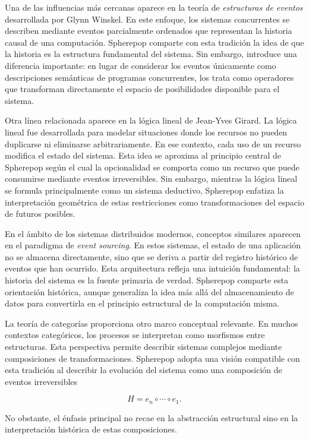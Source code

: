 \documentclass[12pt]{article}
\begin{document}
Una de las influencias más cercanas aparece en la teoría de \emph{estructuras de eventos} desarrollada por Glynn Winskel. En este enfoque, los sistemas concurrentes se describen mediante eventos parcialmente ordenados que representan la historia causal de una computación. Spherepop comparte con esta tradición la idea de que la historia es la estructura fundamental del sistema. Sin embargo, introduce una diferencia importante: en lugar de considerar los eventos únicamente como descripciones semánticas de programas concurrentes, los trata como operadores que transforman directamente el espacio de posibilidades disponible para el sistema.

Otra línea relacionada aparece en la lógica lineal de Jean-Yves Girard. La lógica lineal fue desarrollada para modelar situaciones donde los recursos no pueden duplicarse ni eliminarse arbitrariamente. En ese contexto, cada uso de un recurso modifica el estado del sistema. Esta idea se aproxima al principio central de Spherepop según el cual la opcionalidad se comporta como un recurso que puede consumirse mediante eventos irreversibles. Sin embargo, mientras la lógica lineal se formula principalmente como un sistema deductivo, Spherepop enfatiza la interpretación geométrica de estas restricciones como transformaciones del espacio de futuros posibles.

En el ámbito de los sistemas distribuidos modernos, conceptos similares aparecen en el paradigma de \emph{event sourcing}. En estos sistemas, el estado de una aplicación no se almacena directamente, sino que se deriva a partir del registro histórico de eventos que han ocurrido. Esta arquitectura refleja una intuición fundamental: la historia del sistema es la fuente primaria de verdad. Spherepop comparte esta orientación histórica, aunque generaliza la idea más allá del almacenamiento de datos para convertirla en el principio estructural de la computación misma.

La teoría de categorías proporciona otro marco conceptual relevante. En muchos contextos categóricos, los procesos se interpretan como morfismos entre estructuras. Esta perspectiva permite describir sistemas complejos mediante composiciones de transformaciones. Spherepop adopta una visión compatible con esta tradición al describir la evolución del sistema como una composición de eventos irreversibles

\[
H = e_n \circ \cdots \circ e_1 .
\]

No obstante, el énfasis principal no recae en la abstracción estructural sino en la interpretación histórica de estas composiciones.
\end{document}

